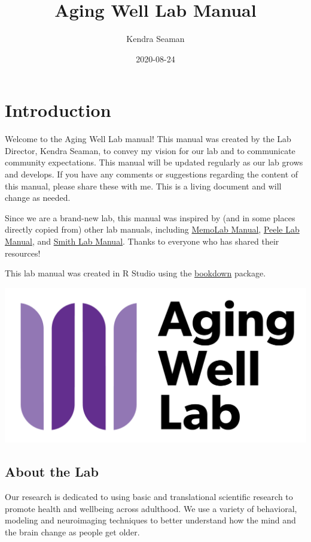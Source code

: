 \documentclass[]{book}
\title{Aging Well Lab Manual}
\author{Kendra Seaman}
\date{2020-08-24}
\begin{document}
\maketitle

{
\setcounter{tocdepth}{1}
\tableofcontents
}
\hypertarget{introduction}{%
\chapter{Introduction}\label{introduction}}

Welcome to the Aging Well Lab manual! This manual was created by the Lab Director, Kendra Seaman, to convey my vision for our lab and to communicate community expectations. This manual will be updated regularly as our lab grows and develops. If you have any comments or suggestions regarding the content of this manual, please share these with me. This is a living document and will change as needed.

Since we are a brand-new lab, this manual was inspired by (and in some places directly copied from) other lab manuals, including \href{https://github.com/memobc/memolab-manual}{MemoLab Manual}, \href{http://jpeelle.net/peellelab_manual.pdf}{Peele Lab Manual}, and \href{https://github.com/DVSneuro/smithlab_manual/blob/master/SmithLab_manual.pdf}{Smith Lab Manual}. Thanks to everyone who has shared their resources!

This lab manual was created in R Studio using the \href{https://bookdown.org/yihui/bookdown/}{bookdown} package.

\includegraphics{images/awl.png}

\hypertarget{about-the-lab}{%
\section{About the Lab}\label{about-the-lab}}

Our research is dedicated to using basic and translational scientific research to promote health and wellbeing across adulthood. We use a variety of behavioral, modeling and neuroimaging techniques to better understand how the mind and the brain change as people get older.
\end{document}
